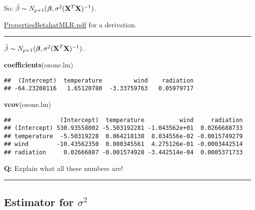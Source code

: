 \documentclass[]{article}
\newenvironment{Shaded}{\begin{snugshade}}{\end{snugshade}}
\newcommand{\KeywordTok}[1]{\textcolor[rgb]{0.13,0.29,0.53}{\textbf{#1}}}
\newcommand{\NormalTok}[1]{#1}
\begin{document}
So:
\(\hat{\beta}\sim N_{p+1}(\boldsymbol{\beta},\sigma^2({\bf X}^T{\bf X})^{-1})\).

\href{https://www.math.ntnu.no/emner/TMA4268/2018v/notes/PropertiesBetahatMLR.pdf}{PropertiesBetahatMLR.pdf}
for a derivation.

\begin{center}\rule{0.5\linewidth}{\linethickness}\end{center}

\(\hat{\beta}\sim N_{p+1}(\boldsymbol{\beta},\sigma^2({\bf X}^T{\bf X})^{-1})\).

\footnotesize

\begin{Shaded}
\begin{Highlighting}[]
\KeywordTok{coefficients}\NormalTok{(ozone.lm)}
\end{Highlighting}
\end{Shaded}

\begin{verbatim}
##  (Intercept)  temperature         wind    radiation 
## -64.23208116   1.65120780  -3.33759763   0.05979717
\end{verbatim}

\begin{Shaded}
\begin{Highlighting}[]
\KeywordTok{vcov}\NormalTok{(ozone.lm)}
\end{Highlighting}
\end{Shaded}

\begin{verbatim}
##              (Intercept)  temperature          wind     radiation
## (Intercept) 530.93558002 -5.503192281 -1.043562e+01  0.0266688733
## temperature  -5.50319228  0.064218138  8.034556e-02 -0.0015749279
## wind        -10.43562350  0.080345561  4.275126e-01 -0.0003442514
## radiation     0.02666887 -0.001574928 -3.442514e-04  0.0005371733
\end{verbatim}

\normalsize

\textbf{Q:} Explain what all these numbers are!

\begin{center}\rule{0.5\linewidth}{\linethickness}\end{center}

\hypertarget{estimator-for-sigma2}{%
\subsection{\texorpdfstring{Estimator for
\(\sigma^2\)}{Estimator for \textbackslash{}sigma\^{}2}}\label{estimator-for-sigma2}}
\end{document}
